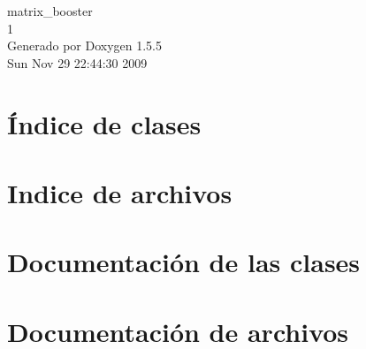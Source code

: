 \documentclass[a4paper]{book}
\begin{document}
\begin{titlepage}
\vspace*{7cm}
\begin{center}
{\Large matrix\_\-booster \\[1ex]\large 1 }\\
\vspace*{1cm}
{\large Generado por Doxygen 1.5.5}\\
\vspace*{0.5cm}
{\small Sun Nov 29 22:44:30 2009}\\
\end{center}
\end{titlepage}
\clearemptydoublepage
{}
\tableofcontents
\clearemptydoublepage
{}
\chapter{Índice de clases}

\chapter{Indice de archivos}

\chapter{Documentación de las clases}

\chapter{Documentación de archivos}









\printindex
\end{document}
